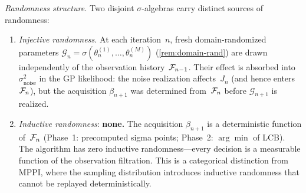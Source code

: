 \begin{remark}
\smallskip\noindent\emph{Randomness structure.}
Two disjoint $\sigma$-algebras carry distinct sources of
randomness:
\begin{enumerate}[label=(\roman*),nosep]
\item \emph{Injective randomness.}
  At each iteration~$n$, fresh domain-randomized parameters
  $\mathcal{G}_n = \sigma(\theta_n^{(1)}, \ldots, \theta_n^{(M)})$
  (\cref{rem:domain-rand}) are drawn independently of the
  observation history~$\mathcal{F}_{n-1}$.
  Their effect is absorbed into $\sigma^2_{\mathrm{noise}}$
  in the GP likelihood: the noise realization affects~$J_n$
  (and hence enters~$\mathcal{F}_n$), but the acquisition
  $\beta_{n+1}$ was determined from~$\mathcal{F}_n$ before
  $\mathcal{G}_{n+1}$ is realized.
\item \emph{Inductive randomness}: \textbf{none.}
  The acquisition $\beta_{n+1}$ is a deterministic function
  of~$\mathcal{F}_n$ (Phase~1: precomputed sigma points; Phase~2:
  $\arg\min$ of LCB).
  The algorithm has zero inductive randomness---every decision
  is a measurable function of the observation filtration.
  This is a categorical distinction from MPPI, where the
  sampling distribution introduces inductive randomness that
  cannot be replayed deterministically.
\end{enumerate}
\end{remark}

